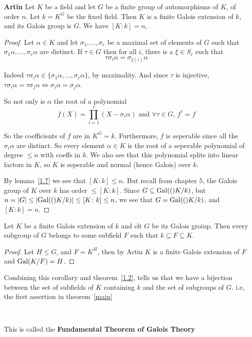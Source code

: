 \begin{theorem}\textbf{Artin}
    Let $K$ be a field and let $G$ be a finite group of automorphisms of $K$, of order $n$. Let $k = K^G$ be the fixed field. Then $K$ is a finite Galois extension of $k$, and its Galois group is $G$. We have $[K\colon k] = n$,

    \begin{proof}
        Let $\alpha\in K$ and let $\sigma_1,\ldots,\sigma_r$ be a maximal set of elements of $G$ such that $\sigma_1\alpha,\ldots,\sigma_r\alpha$ are distinct. If $\tau\in G$ then for all $i$, there is a $\xi\in S_r$ such that\[\tau\sigma_i\alpha = \sigma_{\xi(i)}\alpha\]
    
        Indeed $\tau\sigma_i\alpha\in \{\sigma_1\alpha,\ldots,\sigma_r\alpha\}$, by maximality. And since $\tau$ is injective, $\tau\sigma_i\alpha = \tau\sigma_j\alpha\iff \sigma_i\alpha = \sigma_j\alpha$.
  
        So not only is $\alpha$ the root of a polynomial \[f(X) = \prod_{i=1}^r (X-\sigma_i\alpha) \text{ and }\forall \tau\in G \text{, }f^\tau = f \]

        So the coefficients of $f$ are in $K^G = k$. Furthermore, $f$ is seperable since all the $\sigma_i\alpha$ are distinct. So every element $\alpha\in K$ is the root of a seperable polynomial of degree $\leq n$ with coeffs in $k$. We also see that this polynomial splits into linear factors in $K$, so $K$ is seperable and normal (hence Galois) over $k$.

        By lemma~\ref{1.7} we see that $[K\colon k]\leq n$. But recall from chapter $5$, the Galois group of $K$ over $k$ has order $\leq [K\colon k]$. Since $G\subseteq \text{Gal}(()K/k)$, but $n = |G| \leq |\text{Gal}(()K/k)|\leq [K\colon k]\leq n$, we see that $G = \text{Gal}(()K/k)$, and $[K\colon k] = n$. 
    \end{proof}
 \end{theorem}
\begin{corollary}
    Let $K$ be a finite Galois extension of $k$ and elt $G$ be its Galois groiup. Then every subgroup of $G$ belongs to some subfield $F$ such that $k\subseteq F\subseteq K$.
    \begin{proof}
        Let $H\leq G$, and $F=K^H$, then by Artin $K$ is a finite Galois extension of $F$ and $\text{Gal}(K/F) = H$.
    \end{proof}
\end{corollary}
\begin{bergman}
    Combining this corollary and theorem~\ref{1.2}, tells us that we have a bijection between the set of subfields of $K$ containing $k$ and the set of subgroups of $G$. i.e, the first assertion in theorem~\ref{main}
    
    \

    This is called the \textbf{Fundamental Theorem of Galois Theory}
\end{bergman}

